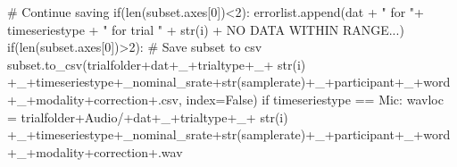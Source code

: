 \documentclass[
  letterpaper,
  DIV=11,
  numbers=noendperiod]{scrreprt}
\newenvironment{Shaded}{\begin{snugshade}}{\end{snugshade}}
\newcommand{\BuiltInTok}[1]{\textcolor[rgb]{0.00,0.23,0.31}{#1}}
\newcommand{\CommentTok}[1]{\textcolor[rgb]{0.37,0.37,0.37}{#1}}
\newcommand{\ControlFlowTok}[1]{\textcolor[rgb]{0.00,0.23,0.31}{#1}}
\newcommand{\DecValTok}[1]{\textcolor[rgb]{0.68,0.00,0.00}{#1}}
\newcommand{\NormalTok}[1]{\textcolor[rgb]{0.00,0.23,0.31}{#1}}
\newcommand{\OperatorTok}[1]{\textcolor[rgb]{0.37,0.37,0.37}{#1}}
\newcommand{\StringTok}[1]{\textcolor[rgb]{0.13,0.47,0.30}{#1}}
\newcommand{\VariableTok}[1]{\textcolor[rgb]{0.07,0.07,0.07}{#1}}
\begin{document}
\begin{Shaded}
\begin{Highlighting}[]
                \CommentTok{\# Continue saving}
                \ControlFlowTok{if}\NormalTok{(}\BuiltInTok{len}\NormalTok{(subset.axes[}\DecValTok{0}\NormalTok{])}\OperatorTok{\textless{}}\DecValTok{2}\NormalTok{):}
\NormalTok{                    errorlist.append(dat }\OperatorTok{+} \StringTok{" for "}\OperatorTok{+}\NormalTok{ timeseriestype }\OperatorTok{+} \StringTok{" for trial "} \OperatorTok{+} \BuiltInTok{str}\NormalTok{(i) }\OperatorTok{+} \StringTok{\textquotesingle{}NO DATA WITHIN RANGE...\textquotesingle{}}\NormalTok{)}
                \ControlFlowTok{if}\NormalTok{(}\BuiltInTok{len}\NormalTok{(subset.axes[}\DecValTok{0}\NormalTok{])}\OperatorTok{\textgreater{}}\DecValTok{2}\NormalTok{):}
                     \CommentTok{\# Save subset to csv}
\NormalTok{                      subset.to\_csv(trialfolder}\OperatorTok{+}\NormalTok{dat}\OperatorTok{+}\StringTok{\textquotesingle{}\_\textquotesingle{}}\OperatorTok{+}\NormalTok{trialtype}\OperatorTok{+}\StringTok{\textquotesingle{}\_\textquotesingle{}}\OperatorTok{+} \BuiltInTok{str}\NormalTok{(i) }\OperatorTok{+}\StringTok{\textquotesingle{}\_\textquotesingle{}}\OperatorTok{+}\NormalTok{timeseriestype}\OperatorTok{+}\StringTok{\textquotesingle{}\_nominal\_srate\textquotesingle{}}\OperatorTok{+}\BuiltInTok{str}\NormalTok{(samplerate)}\OperatorTok{+}\StringTok{\textquotesingle{}\_\textquotesingle{}}\OperatorTok{+}\NormalTok{participant}\OperatorTok{+}\StringTok{\textquotesingle{}\_\textquotesingle{}}\OperatorTok{+}\NormalTok{word}\OperatorTok{+}\StringTok{\textquotesingle{}\_\textquotesingle{}}\OperatorTok{+}\NormalTok{modality}\OperatorTok{+}\NormalTok{correction}\OperatorTok{+}\StringTok{\textquotesingle{}.csv\textquotesingle{}}\NormalTok{, index}\OperatorTok{=}\VariableTok{False}\NormalTok{)}
                      \ControlFlowTok{if}\NormalTok{ timeseriestype }\OperatorTok{==} \StringTok{\textquotesingle{}Mic\textquotesingle{}}\NormalTok{:}
\NormalTok{                            wavloc }\OperatorTok{=}\NormalTok{ trialfolder}\OperatorTok{+}\StringTok{\textquotesingle{}Audio/\textquotesingle{}}\OperatorTok{+}\NormalTok{dat}\OperatorTok{+}\StringTok{\textquotesingle{}\_\textquotesingle{}}\OperatorTok{+}\NormalTok{trialtype}\OperatorTok{+}\StringTok{\textquotesingle{}\_\textquotesingle{}}\OperatorTok{+} \BuiltInTok{str}\NormalTok{(i) }\OperatorTok{+}\StringTok{\textquotesingle{}\_\textquotesingle{}}\OperatorTok{+}\NormalTok{timeseriestype}\OperatorTok{+}\StringTok{\textquotesingle{}\_nominal\_srate\textquotesingle{}}\OperatorTok{+}\BuiltInTok{str}\NormalTok{(samplerate)}\OperatorTok{+}\StringTok{\textquotesingle{}\_\textquotesingle{}}\OperatorTok{+}\NormalTok{participant}\OperatorTok{+}\StringTok{\textquotesingle{}\_\textquotesingle{}}\OperatorTok{+}\NormalTok{word}\OperatorTok{+}\StringTok{\textquotesingle{}\_\textquotesingle{}}\OperatorTok{+}\NormalTok{modality}\OperatorTok{+}\NormalTok{correction}\OperatorTok{+}\StringTok{\textquotesingle{}.wav\textquotesingle{}}

\end{Highlighting}
\end{Shaded}
\end{document}
